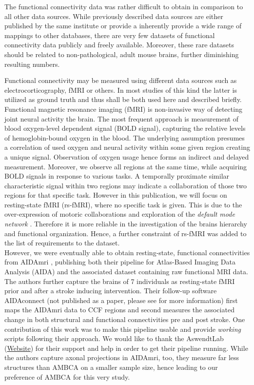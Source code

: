 \documentclass[]{article}
\renewcommand{\cite}{\citep}
\begin{document}
The functional connectivity data was rather difficult to obtain in comparison to all other data sources. While previously described data sources are either published by the same institute or provide a inherently provide a wide range of mappings to other databases, there are very few datasets of functional connectivity data publicly and freely available. Moreover, these rare datasets should be related to non-pathological, adult mouse brains, further diminishing resulting numbers. 

Functional connectivity may be measured using different data sources such as electrocorticography, fMRI or others. In most studies of this kind the latter is utilized as ground truth and thus shall be both used here and described briefly.
Functional magnetic resonance imaging (fMRI) is non-invasive way of detecting joint neural activity the brain. The most frequent approach is measurement of blood oxygen-level dependent signal (BOLD signal), capturing the relative levels of hemoglobin-bound oxygen in the blood. The underlying assumption presumes a correlation of used oxygen and neural activity within some given region creating a unique signal. Observation of oxygen usage hence forms an indirect and delayed measurement. Moreover, we observe all regions at the same time, while acquiring BOLD signals in response to various tasks. A temporally proximate similar characteristic signal within two regions may indicate a collaboration of those two regions for that specific task. 
However in this publication, we will focus on resting-state fMRI (rs-fMRI), where no specific task is given. This is due to the over-expression of motoric collaborations and exploration of the \textit{default mode network} \cite{sporns2016networks}. Therefore it is more reliable in the investigation of the brains hierarchy and functional organization. Hence, a further constraint of rs-fMRI was added to the list of requirements to the dataset.\\

However, we were eventually able to obtain resting-state, functional connectivities from AIDAmri \cite{AIDAmri2019}, publishing both their pipeline for Atlas-Based Imaging Data Analysis (AIDA) and the associated dataset containing raw functional MRI data. The authors further capture the brains of 7 individuals as resting-state fMRI prior and after a stroke inducing intervention. Their follow-up software AIDAconnect (not published as a paper, please see  for more information) first maps the AIDAmri data to CCF regions and second measures the associated change in both structural and functional connectivities pre and post stroke. One contribution of this work was to make this pipeline usable and provide \textit{working} scripts following their approach. We would like to thank the AswendtLab (\href{https://neurologie.uk-koeln.de/forschung/ag-neuroimaging-neuroengineering/}{Website}) for their support and help in order to get their pipeline running. 
While the authors capture axonal projections in AIDAmri, too, they measure far less structures than AMBCA on a smaller sample size, hence leading to our preference of AMBCA for this very study. \\
\end{document}
